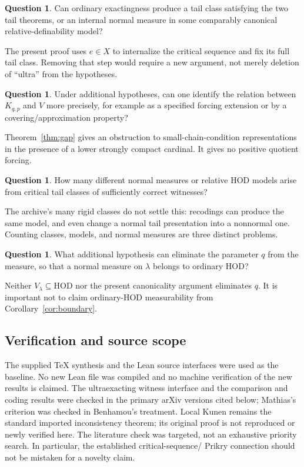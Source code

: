 \documentclass[11pt,letterpaper]{article}
\theoremstyle{definition}
\newtheorem{question}[definition]{Question}
\numberwithin{equation}{section}
\newcommand{\HOD}{\mathrm{HOD}}
\begin{document}
\begin{question}
Can ordinary exactingness produce a tail class satisfying the two
tail theorems, or an internal normal measure in some comparably
canonical relative-definability model?
\end{question}
The present proof uses $e\in X$ to internalize the critical sequence
and fix its full tail class. Removing that step would require a new
argument, not merely deletion of ``ultra'' from the hypotheses.

\begin{question}
Under additional hypotheses, can one identify the relation between
$K_{q,p}$ and $V$ more precisely, for example as a specified forcing
extension or by a covering/approximation property?
\end{question}
Theorem~\ref{thm:gap} gives an obstruction to small-chain-condition
representations in the presence of a lower strongly compact cardinal.
It gives no positive quotient forcing.

\begin{question}
How many different normal measures or relative HOD models arise from
critical tail classes of sufficiently correct witnesses?
\end{question}
The archive's many rigid classes do not settle this: recodings can
produce the same model, and even change a normal tail presentation
into a nonnormal one. Counting classes, models, and normal measures
are three distinct problems.

\begin{question}
What additional hypothesis can eliminate the parameter $q$ from the
measure, so that a normal measure on $\lambda$ belongs to ordinary
$\HOD$?
\end{question}
Neither $V_\lambda\subseteq\HOD$ nor the present canonicality argument
eliminates $q$. It is important not to claim ordinary-HOD measurability
from Corollary~\ref{cor:boundary}.

\subsection{Verification and source scope}

The supplied TeX synthesis and the Lean source interfaces were used
as the baseline. No new Lean file was compiled and no machine
verification of the new results is claimed. The ultraexacting witness
interface and the comparison and coding results were checked in the
primary arXiv versions cited below; Mathias's criterion was checked
in Benhamou's treatment. Local Kunen remains the standard imported
inconsistency theorem; its original proof is not reproduced or newly
verified here. The literature check was targeted, not an exhaustive
priority search. In particular, the established critical-sequence/
Prikry connection should not be mistaken for a novelty claim.
\end{document}
